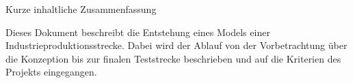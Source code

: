 
Kurze inhaltliche Zusammenfassung

Dieses Dokument beschreibt die Entstehung eines Models einer Industrieproduktionsstrecke.
Dabei wird der Ablauf von der Vorbetrachtung über die Konzeption bis zur finalen Teststrecke beschrieben
und auf die Kriterien des Projekts eingegangen.

